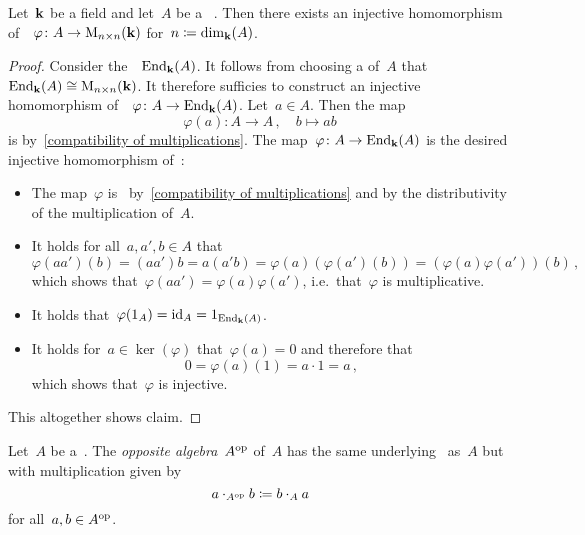 \begin{lemma}
  Let~$\kf$ be a field and let~$A$ be a {\fd}~{\kalg}.
  Then there exists an injective homomorphism of~{\kalgs}~$\varphi \colon A \to \operatorname{M}_{n \times n}(\mathbf{k})$ for~$n \coloneqq \dim_{\mathbf{k}}(A)$.
\end{lemma}


\begin{proof}
  Consider the~{\kalg}~$\operatorname{End}_{\mathbf{k}}(A)$.
  It follows from choosing a  of~$A$ that~$\operatorname{End}_{\mathbf{k}}(A) \cong \operatorname{M}_{n \times n}(\mathbf{k})$.
  It therefore sufficies to construct an injective homomorphism of~{\kalgs}~$\varphi \colon A \to \operatorname{End}_{\mathbf{k}}(A)$.
  Let~$a \in A$.
  Then the map
  \[
            \varphi(a)
    \colon  A
    \to     A \,,
    \quad   b
    \mapsto ab
  \]
  is {\klin} by~\eqref{compatibility of multiplications}.
  The map~$\varphi \colon A \to \operatorname{End}_{\mathbf{k}}(A)$ is the desired injective homomorphism of~{\kalgs}:
  \begin{itemize}
    \item
      The map~$\varphi$ is~{\klin} by~\eqref{compatibility of multiplications} and by the distributivity of the multiplication of~$A$.
    \item
      It holds for all~$a, a', b \in A$ that
      \[
          \varphi(a a')(b)
        = (a a') b
        = a (a' b)
        = \varphi(a)( \varphi(a')(b) )
        = (\varphi(a) \varphi(a'))(b) \,,
      \]
      which shows that~$\varphi(a a') = \varphi(a) \varphi(a')$, i.e.\ that~$\varphi$ is multiplicative.
    \item
      It holds that~$\varphi(1_A) = \operatorname{id}_A = 1_{\operatorname{End}_{\mathbf{k}}(A)}$.
    \item
      It holds for~$a \in \ker(\varphi)$ that~$\varphi(a) = 0$ and therefore that
      \[
          0
        = \varphi(a)(1)
        = a \cdot 1
        = a \,,
      \]
      which shows that~$\varphi$ is injective.
  \end{itemize}
  This altogether shows claim.
\end{proof}










\begin{definition}
  Let~$A$ be a~{\kalg}.
  The \emph{opposite algebra}~$A^{\mathrm{op}}$ of~$A$ has the same underlying~{\module{$\kf$}} as~$A$ but with multiplication given by
  \[
              a \cdot_{A^{\mathrm{op}}} b
    \coloneqq  b \cdot_A a
  \]
  for all~$a, b \in A^{\mathrm{op}}$.
\end{definition}


